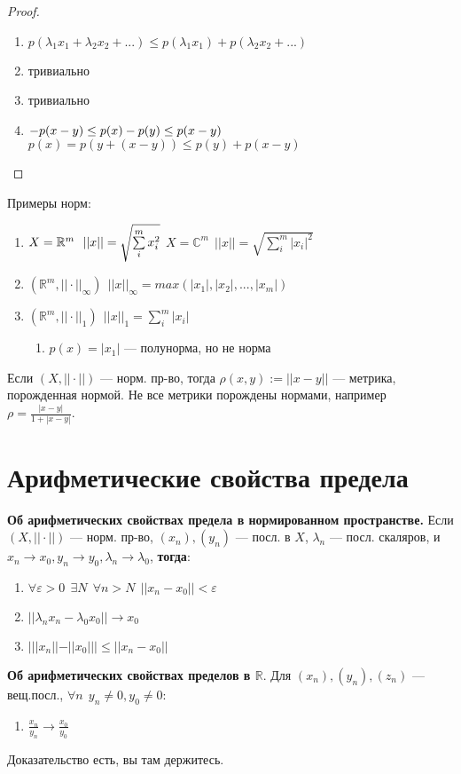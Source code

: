 \begin{proof}
\begin{enumerate}
\item $p(\lambda_1x_1+\lambda_2x_2+...)\leq p(\lambda_1x_1)+p(\lambda_2x_2+...)$
\item тривиально
\item тривиально
\item $-p(x-y)\leq p(x)-p(y)\leq p(x-y)\\$
$p(x)=p(y+(x-y))\leq p(y)+p(x-y)$
\end{enumerate}
\end{proof}

Примеры норм:
\begin{enumerate}
\item $X=\mathbb R^m \ \ ||x||=\sqrt{\sum\limits_{i}^m x_i^2} \\$
$X=\mathbb{C}^m \ \ ||x||=\sqrt{\sum\limits_{i}^m |x_i|^2}$
\item $(\mathbb R^m, ||\cdot||_\infty) \ \ ||x||_\infty=max(|x_1|,|x_2|,...,|x_m|)$
\item $(\mathbb R^m, ||\cdot||_1) \ \ ||x||_1=\sum\limits_i^m |x_i|$
\begin{enumerate}
\item $p(x)=|x_1|$ --- полунорма, но не норма
\end{enumerate}
\end{enumerate}

\begin{remark}
Если $(X, ||\cdot||)$ --- норм. пр-во, тогда $\rho(x,y):=||x-y||$ --- метрика,
порожденная нормой. Не все метрики порождены нормами, например $\rho=\frac{|x-y|}{1+|x-y|}$.
\end{remark}

\section*{Арифметические свойства предела}

\begin{theorem}
\textbf{Об арифметических свойствах предела в нормированном пространстве.}
Если $(X, ||\cdot||)$ --- норм. пр-во, $(x_n),(y_n)$ --- посл. в $X$, $\lambda_n$ ---
посл. скаляров, и $x_n\to x_0, y_n\to y_0, \lambda_n\to \lambda_0$, \textbf{тогда}:
\begin{enumerate}
\item $\forall \varepsilon>0 \ \ \exists N \ \ \forall n>N \ \ ||x_n-x_0||<\varepsilon$
\item $||\lambda_nx_n-\lambda_0x_0||\to x_0$
\item $|||x_n||-||x_0|||\leq||x_n-x_0||$
\end{enumerate}
\end{theorem}

\begin{theorem}
\textbf{Об арифметических свойствах пределов в $\mathbb{R}$}. Для $(x_n),(y_n),(z_n)$ 
--- вещ.посл., $\forall n \ \ y_n\not =0, y_0\not = 0$:
\begin{enumerate}[resume]
\item $\frac{x_n}{y_n}\to\frac{x_0}{y_0}$
\end{enumerate}
\end{theorem}

Доказательство есть, вы там держитесь.

